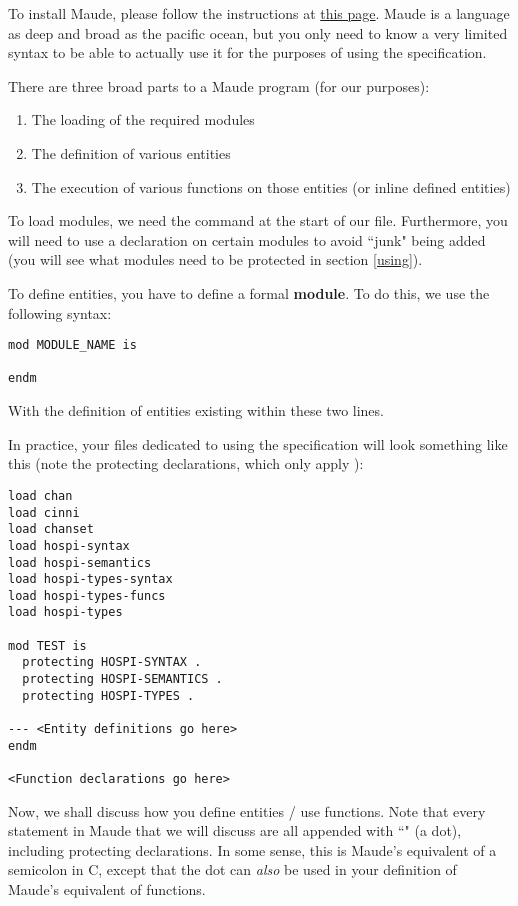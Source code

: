 To install Maude, please follow the instructions at \href{http://maude.cs.illinois.edu/w/index.php/Maude_download_and_installation}{this page}.
Maude is a language as deep and broad as the pacific ocean, but you only need to know a very limited syntax to be able to actually use it for the purposes of using the specification.

There are three broad parts to a Maude program (for our purposes):
\begin{enumerate}
    \item The loading of the required modules
    \item The definition of various entities 
    \item The execution of various functions on those entities (or inline defined entities)
\end{enumerate}

To load modules, we need the  command at the start of our file. Furthermore, you will need to use a  declaration on certain modules to avoid ``junk" being added (you will see what modules need to be protected in section \ref{using}).

To define entities, you have to define a formal \textbf{module}. To do this, we use the following syntax:

\begin{verbatim}
mod MODULE_NAME is

endm
\end{verbatim}
With the definition of entities existing within these two lines.

In practice, your files dedicated to using the specification will look something like this (note the protecting declarations, which only apply ):
\begin{verbatim}
load chan
load cinni
load chanset
load hospi-syntax
load hospi-semantics
load hospi-types-syntax
load hospi-types-funcs
load hospi-types

mod TEST is
  protecting HOSPI-SYNTAX .
  protecting HOSPI-SEMANTICS .
  protecting HOSPI-TYPES .

--- <Entity definitions go here>
endm

<Function declarations go here>

\end{verbatim}

Now, we shall discuss how you define entities / use functions. Note that every statement in Maude that we will discuss are all appended with ``" (a dot), including protecting declarations. In some sense, this is Maude's equivalent of a semicolon in C, except that the dot can \textit{also} be used in your definition of Maude's equivalent of functions.


